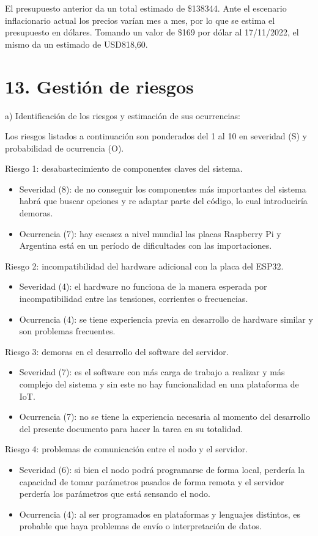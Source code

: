 \documentclass[
11pt, %
]{charter}
\begin{document}
El presupuesto anterior da un total estimado de \$138344. Ante el escenario inflacionario actual los precios varían mes a mes, por lo que se estima el presupuesto en dólares. Tomando un valor de \$169 por dólar al 17/11/2022, el mismo da un estimado de USD818,60.

\section{13. Gestión de riesgos}
\label{sec:riesgos}

a) Identificación de los riesgos y estimación de sus ocurrencias:

Los riesgos listados a continuación son ponderados del 1 al 10 en severidad (S) y probabilidad de ocurrencia (O).
 
Riesgo 1: desabastecimiento de componentes claves del sistema.
\begin{itemize}
	\item Severidad (8): de no conseguir los componentes más importantes del sistema habrá que buscar opciones y re adaptar parte del código, lo cual introduciría demoras.
	\item Ocurrencia (7): hay escasez a nivel mundial las placas Raspberry Pi y Argentina está en un período de dificultades con las importaciones.
\end{itemize}   

Riesgo 2: incompatibilidad del hardware adicional con la placa del ESP32.
\begin{itemize}
	\item Severidad (4): el hardware no funciona de la manera esperada por incompatibilidad entre las tensiones, corrientes o frecuencias.
	\item Ocurrencia (4): se tiene experiencia previa en desarrollo de hardware similar y son problemas frecuentes.
\end{itemize}

Riesgo 3: demoras en el desarrollo del software del servidor.
\begin{itemize}
	\item Severidad (7): es el software con más carga de trabajo a realizar y más complejo del sistema y sin este no hay funcionalidad en una plataforma de IoT.
	\item Ocurrencia (7): no se tiene la experiencia necesaria al momento del desarrollo del presente documento para hacer la tarea en su totalidad.
\end{itemize}

Riesgo 4: problemas de comunicación entre el nodo y el servidor.
\begin{itemize}
	\item Severidad (6): si bien el nodo podrá programarse de forma local, perdería la capacidad de tomar parámetros pasados de forma remota y el servidor perdería los parámetros que está sensando el nodo.
	\item Ocurrencia (4): al ser programados en plataformas y lenguajes distintos, es probable que haya problemas de envío o interpretación de datos.
\end{itemize}
\end{document}
